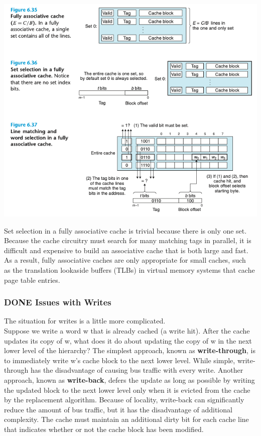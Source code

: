 \documentclass[11pt]{article}
\begin{document}
\begin{center}
\includegraphics[width=.9\linewidth]{pics/figure6.35-6.37-fully-associative-cache.png}
\end{center}

Set selection in a fully associative cache is trivial because there is only one set.\\

Because the cache circuitry must search for many matching tags in parallel, it is difficult and expensive to build an associative cache that is both large and fast. As a result, fully associative caches are only appropriate for small caches, such\\
as the translation lookaside buffers (TLBs) in virtual memory systems that cache page table entries.\\


\subsubsection{{\bfseries\sffamily DONE} Issues with Writes}
\label{sec:org65e5eb1}
The situation for writes is a little more complicated.\\

Suppose we write a word w that is already cached (a write hit). After the cache updates its copy of w, what does it do about updating the copy of w in the next lower level of the hierarchy? The simplest approach, known as \textbf{write-through}, is to immediately write w’s cache block to the next lower level. While simple, write-through has the disadvantage of causing bus traffic with every write. Another approach, known as \textbf{write-back}, defers the update as long as possible by writing the updated block to the next lower level only when it is evicted from the cache by the replacement algorithm. Because of locality, write-back can significantly reduce the amount of bus traffic, but it has the disadvantage of additional complexity. The cache must maintain an additional dirty bit for each cache line that indicates whether or not the cache block has been modified.\\
\end{document}
